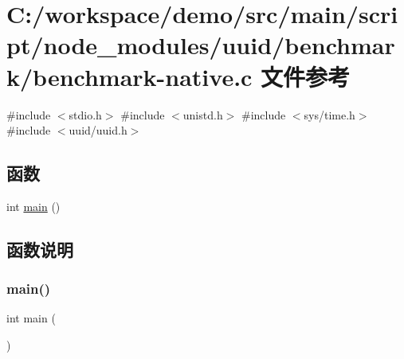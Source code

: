 \hypertarget{benchmark-native_8c}{}\section{C\+:/workspace/demo/src/main/script/node\+\_\+modules/uuid/benchmark/benchmark-\/native.c 文件参考}
\label{benchmark-native_8c}
{\ttfamily \#include $<$stdio.\+h$>$}\newline
{\ttfamily \#include $<$unistd.\+h$>$}\newline
{\ttfamily \#include $<$sys/time.\+h$>$}\newline
{\ttfamily \#include $<$uuid/uuid.\+h$>$}\newline
\subsection*{函数}
\begin{DoxyCompactItemize}
\item 
int \mbox{\hyperlink{benchmark-native_8c_ae66f6b31b5ad750f1fe042a706a4e3d4}{main}} ()
\end{DoxyCompactItemize}


\subsection{函数说明}
\mbox{\label{benchmark-native_8c_ae66f6b31b5ad750f1fe042a706a4e3d4}} 
\subsubsection{\texorpdfstring{main()}{main()}}
{\footnotesize\ttfamily int main (\begin{DoxyParamCaption}{ }\end{DoxyParamCaption})}

